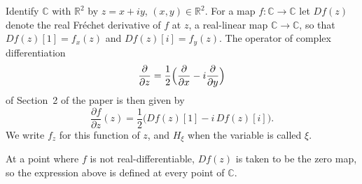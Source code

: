 \begin{definition}
Identify $\mathbb{C}$ with $\mathbb{R}^2$ by $z=x+iy$, $(x,y)\in\mathbb{R}^2$.
For a map $f\colon\mathbb{C}\to\mathbb{C}$ let $Df(z)$ denote the real
Fr\'echet derivative of $f$ at $z$, a real-linear map
$\mathbb{C}\to\mathbb{C}$, so that $Df(z)[1]=f_x(z)$ and $Df(z)[i]=f_y(z)$.
The operator of complex differentiation
\[
  \frac{\partial}{\partial z}=\frac12\Bigl(\frac{\partial}{\partial x}-i\frac{\partial}{\partial y}\Bigr)
\]
of Section~2 of the paper is then given by
\[
  \frac{\partial f}{\partial z}(z)=\frac12\bigl(Df(z)[1]-i\,Df(z)[i]\bigr).
\]
We write $f_z$ for this function of $z$, and $H_\xi$ when the variable is
called $\xi$.

At a point where $f$ is not real-differentiable, $Df(z)$ is taken to be the
zero map, so the expression above is defined at every point of $\mathbb{C}$.
\end{definition}
